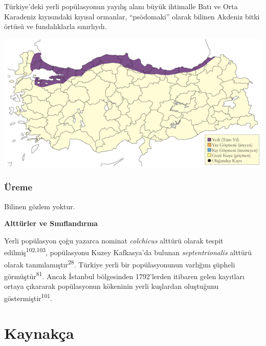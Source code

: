 \documentclass[
  letterpaper,
  DIV=11,
  numbers=noendperiod]{scrreprt}
\begin{document}
Türkiye'deki yerli popülasyonun yayılış alanı büyük ihtimalle Batı ve
Orta Karadeniz kıyısındaki kıyısal ormanlar, ``psödomaki'' olarak
bilinen Akdeniz bitki örtüsü ve fundalıklarla sınırlıydı.

\includegraphics{images/harita_Page_044.png}

\hypertarget{uxfcreme-43}{%
\subsection{\texorpdfstring{\textbf{Üreme}}{Üreme}}\label{uxfcreme-43}}

Bilinen gözlem yoktur.

\textbf{Alttürler ve Sınıflandırma}

Yerli popülasyon çoğu yazarca nominat \emph{colchicus} alttürü olarak
tespit edilmiş\textsuperscript{102,103}, popülasyonu Kuzey Kafkasya'da
bulunan \emph{septentrionalis} alttürü olarak
tanımlamıştır\textsuperscript{28}. Türkiye yerli bir popülasyonunun
varlığını şüpheli görmüştür\textsuperscript{81}. Ancak İstanbul
bölgesinden 1792'lerden itibaren gelen kayıtları ortaya çıkararak
popülasyonun kökeninin yerli kuşlardan oluştuğunu
göstermiştir\textsuperscript{101}.


\hypertarget{kaynakuxe7a}{%
\chapter*{Kaynakça}\label{kaynakuxe7a}}

\end{document}

